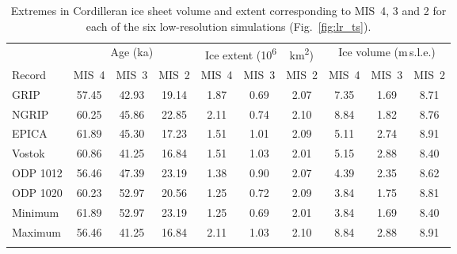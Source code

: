 \documentclass[tc, manuscript]{copernicus}
\begin{document}
\begin{table}
  \caption{%
Extremes in Cordilleran ice sheet volume and extent corresponding to
           MIS~4, 3 and 2 for each of the six low-resolution simulations
           (Fig.~\ref{fig:lr_ts}).}
\label{tab:extrema}
  {
{\begin{tabular}{l|ccc|ccc|ccc}
    \tophline
             & \multicolumn{3}{c|}{Age (ka)}
             & \multicolumn{3}{c|}{Ice extent (\unit{10^6\,km^2})}
             & \multicolumn{3}{c}{Ice volume (m\,s.l.e.)} \\
    Record   &  MIS~4 &  MIS~3 &  MIS~2
             &  MIS~4 &  MIS~3 &  MIS~2
             &  MIS~4 &  MIS~3 &  MIS~2 \\
    \middlehline
    GRIP     &  57.45 &  42.93 &  19.14
             &   1.87 &   0.69 &   2.07
             &   7.35 &   1.69 &   8.71 \\
    NGRIP    &  60.25 &  45.86 &  22.85
             &   2.11 &   0.74 &   2.10
             &   8.84 &   1.82 &   8.76 \\
    EPICA    &  61.89 &  45.30 &  17.23
             &   1.51 &   1.01 &   2.09
             &   5.11 &   2.74 &   8.91 \\
    Vostok   &  60.86 &  41.25 &  16.84
             &   1.51 &   1.03 &   2.01
             &   5.15 &   2.88 &   8.40 \\
    ODP 1012 &  56.46 &  47.39 &  23.19
             &   1.38 &   0.90 &   2.07
             &   4.39 &   2.35 &   8.62 \\
    ODP 1020 &  60.23 &  52.97 &  20.56
             &   1.25 &   0.72 &   2.09
             &   3.84 &   1.75 &   8.81 \\
    \cline{1-10}
    Minimum  &  61.89 &  52.97 &  23.19
             &   1.25 &   0.69 &   2.01
             &   3.84 &   1.69 &   8.40 \\
    Maximum  &  56.46 &  41.25 &  16.84
             &   2.11 &   1.03 &   2.10
             &   8.84 &   2.88 &   8.91 \\
    \bottomhline
\end{tabular}}}
\end{table}
\end{document}
